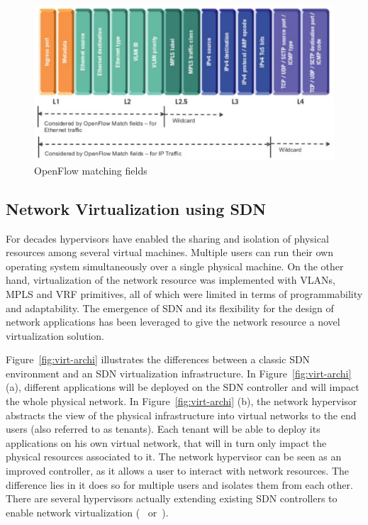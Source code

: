 \begin{figure}[h]
    \centering
    \includegraphics[scale=0.7]{figures/openflow-matchfields.pdf}
    \caption{OpenFlow matching fields~\cite{openflow-matchfields}}
    \label{fig:matching-fields}
\end{figure}

\subsection{Network Virtualization using SDN}
\label{def:netvirt}

For decades hypervisors have enabled the sharing and isolation of physical resources among several virtual machines.
Multiple users can run their own operating system simultaneously over a single physical machine.
On the other hand, virtualization of the network resource was implemented with VLANs, MPLS and VRF primitives, all of which were limited in terms of programmability and adaptability. The emergence of SDN and its flexibility for the design of network applications has been leveraged to give the network resource a novel virtualization solution.

Figure~\ref{fig:virt-archi} illustrates the differences between a classic SDN environment and an SDN virtualization infrastructure. In Figure~\ref{fig:virt-archi} (a), different applications will be deployed on the SDN controller and will impact the whole physical network.
In Figure~\ref{fig:virt-archi} (b), the network hypervisor abstracts the view of the physical infrastructure into virtual networks to the end users (also referred to as tenants).
Each tenant will be able to deploy its applications on his own virtual network, that will in turn only impact the physical resources associated to it.
The network hypervisor can be seen as an improved controller, as it allows a user to interact with network resources. The difference lies in it does so for multiple users and isolates them from each other.
There are several hypervisors actually extending existing SDN controllers to enable network virtualization (\eg~\cite{FlowN-Drutskoy2012} or~\cite{ONVisor-Han2018}).

